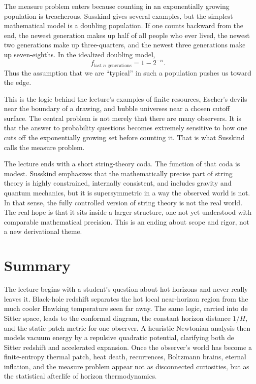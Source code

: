 The measure problem enters because counting in an exponentially growing population is treacherous. Susskind gives several examples, but the simplest mathematical model is a doubling population. If one counts backward from the end, the newest generation makes up half of all people who ever lived, the newest two generations make up three-quarters, and the newest three generations make up seven-eighths. In the idealized doubling model,
\begin{equation}
f_{\text{last }n\text{ generations}}=1-2^{-n}.
\end{equation}
Thus the assumption that we are ``typical'' in such a population pushes us toward the edge.

This is the logic behind the lecture's examples of finite resources, Escher's devils near the boundary of a drawing, and bubble universes near a chosen cutoff surface. The central problem is not merely that there are many observers. It is that the answer to probability questions becomes extremely sensitive to how one cuts off the exponentially growing set before counting it. That is what Susskind calls the measure problem.

The lecture ends with a short string-theory coda. The function of that coda is modest. Susskind emphasizes that the mathematically precise part of string theory is highly constrained, internally consistent, and includes gravity and quantum mechanics, but it is supersymmetric in a way the observed world is not. In that sense, the fully controlled version of string theory is not the real world. The real hope is that it sits inside a larger structure, one not yet understood with comparable mathematical precision. This is an ending about scope and rigor, not a new derivational theme.

\section{Summary}

The lecture begins with a student's question about hot horizons and never really leaves it. Black-hole redshift separates the hot local near-horizon region from the much cooler Hawking temperature seen far away. The same logic, carried into de Sitter space, leads to the conformal diagram, the constant horizon distance \(1/H\), and the static patch metric for one observer. A heuristic Newtonian analysis then models vacuum energy by a repulsive quadratic potential, clarifying both de Sitter redshift and accelerated expansion. Once the observer's world has become a finite-entropy thermal patch, heat death, recurrences, Boltzmann brains, eternal inflation, and the measure problem appear not as disconnected curiosities, but as the statistical afterlife of horizon thermodynamics.